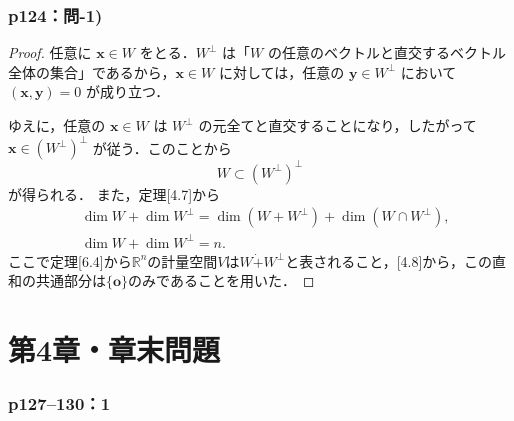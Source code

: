 \documentclass[a4paper,10pt,fleqn]{ltjsarticle}
\begin{document}
\section*{p124：問-1)}

\begin{tleftbar}
  \begin{proof}
    任意に $\bm{x} \in W$ をとる．$W^{\perp}$ は「$W$ の任意のベクトルと直交するベクトル全体の集合」であるから，$\bm{x} \in W$ に対しては，任意の $\bm{y} \in W^{\perp}$ において $(\bm{x}, \bm{y})=0$ が成り立つ．

    ゆえに，任意の $\bm{x} \in W$ は $W^{\perp}$ の元全てと直交することになり，したがって $\bm{x} \in (W^{\perp})^{\perp}$ が従う．このことから
    \[
      W \subset (W^{\perp})^{\perp}
    \]
    が得られる．
    また，定理[4.7]から
    \begin{align*}
       & \dim W +\dim W^{\perp} =\dim (W +W^{\perp} )+\dim (W \cap W^{\perp} ), \\
       & \dim W +\dim W^{\perp} =n.
    \end{align*}
    ここで定理[6.4]から$\mathbb{R}^n$の計量空間$V$は$W\dot{+}W^{\perp}$と表されること，[4.8]から，この直和の共通部分は$\{ \bm{o} \}$のみであることを用いた．
  \end{proof}
\end{tleftbar}


\newpage
\part*{第4章・章末問題}


\section*{p127--130：1}
\end{document}
